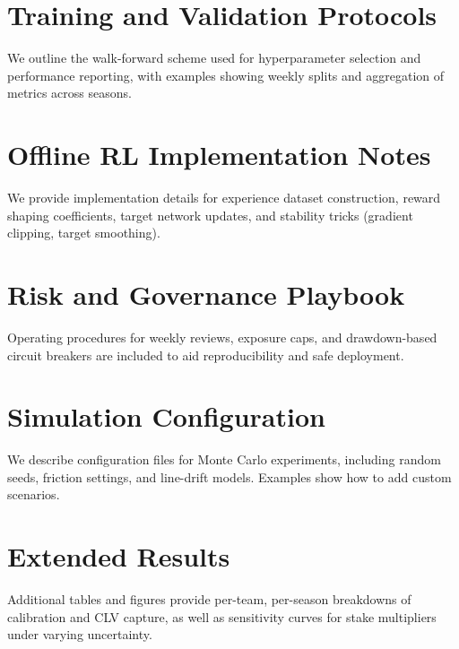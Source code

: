 \documentclass[12pt]{report}  %
\numberwithin{equation}{section}
\theoremstyle{plain}
\theoremstyle{definition}
\theoremstyle{remark}
\begin{document}
\section{Training and Validation Protocols}
We outline the walk-forward scheme used for hyperparameter selection and performance reporting, with examples showing weekly splits and aggregation of metrics across seasons.

\section{Offline RL Implementation Notes}
We provide implementation details for experience dataset construction, reward shaping coefficients, target network updates, and stability tricks (gradient clipping, target smoothing).

\section{Risk and Governance Playbook}
Operating procedures for weekly reviews, exposure caps, and drawdown-based circuit breakers are included to aid reproducibility and safe deployment.

\section{Simulation Configuration}
We describe configuration files for Monte Carlo experiments, including random seeds, friction settings, and line-drift models. Examples show how to add custom scenarios.

\section{Extended Results}
Additional tables and figures provide per-team, per-season breakdowns of calibration and CLV capture, as well as sensitivity curves for stake multipliers under varying uncertainty.
\end{document}
